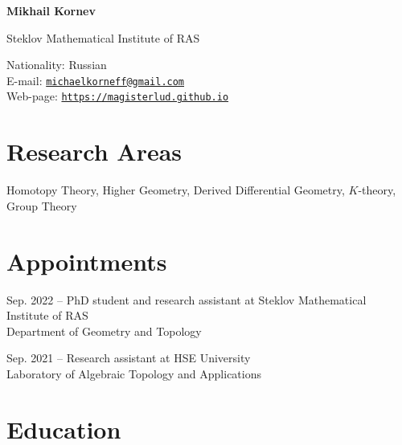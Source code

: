 \documentclass[11pt,letterpaper]{report}
\newcommand{\myname}{Mikhail Kornev}
\newcommand{\namefont}[1]{{\normalfont\bfseries\Huge{#1}}}
\begin{document}
    \raggedright{}

    \namefont{\myname}

    \vspace{1em}
    \begin{minipage}[t]{2.5in}
        Steklov Mathematical Institute of RAS 
    \end{minipage}
    \hfill
    \begin{minipage}[t]{3in}
        Nationality: Russian\\
        E-mail: \href{mailto:michaelkorneff@gmail.com}{\tt michaelkorneff@gmail.com}\\
        Web-page: \href{https://magisterlud.github.io}{\tt https://magisterlud.github.io}
    \end{minipage}
    
    \section*{Research Areas}

    Homotopy Theory, Higher Geometry, Derived Differential Geometry, $K$-theory, Group Theory    
    
    
    
     \section*{Appointments}

    \begin{tablist}

        \item[Sep. 2022 --]   \tab{}PhD student and research assistant at Steklov Mathematical Institute of RAS  \\
                              Department of Geometry and Topology

        \item[Sep. 2021 --]  \tab{}Research assistant at HSE University \\
                              Laboratory of Algebraic Topology and Applications

    \end{tablist}




    \section*{Education}
\end{document}

